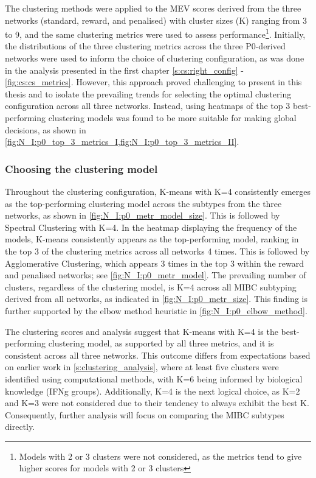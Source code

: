 The clustering methods were applied to the MEV scores derived from the three networks (standard, reward, and penalised) with cluster sizes (K) ranging from 3 to 9, and the same clustering metrics were used to assess performance\footnote{Models with 2 or 3 clusters were not considered, as the metrics tend to give higher scores for models with 2 or 3 clusters}. Initially, the distributions of the three clustering metrics across the three P0-derived networks were used to inform the choice of clustering configuration, as was done in the analysis presented in the first chapter \cref{s:cs:right_config} - \cref{fig:cs:cs_metrics}. However, this approach proved challenging to present in this thesis and to isolate the prevailing trends for selecting the optimal clustering configuration across all three networks. Instead, using heatmaps of the top 3 best-performing clustering models was found to be more suitable for making global decisions, as shown in \cref{fig:N_I:p0_top_3_metrics_I,fig:N_I:p0_top_3_metrics_II}.

\subsubsection*{Choosing the clustering model} \label{s:ap:p0_clustering}

Throughout the clustering configuration, K-means with K=4 consistently emerges as the top-performing clustering model across the subtypes from the three networks, as shown in \cref{fig:N_I:p0_metr_model_size}. This is followed by Spectral Clustering with K=4. In the heatmap displaying the frequency of the models, K-means consistently appears as the top-performing model, ranking in the top 3 of the clustering metrics across all networks 4 times. This is followed by Agglomerative Clustering, which appears 3 times in the top 3 within the reward and penalised networks; see \cref{fig:N_I:p0_metr_model}. The prevailing number of clusters, regardless of the clustering model, is K=4 across all MIBC subtyping derived from all networks, as indicated in \cref{fig:N_I:p0_metr_size}. This finding is further supported by the elbow method heuristic in \cref{fig:N_I:p0_elbow_method}.

The clustering scores and analysis suggest that K-means with K=4 is the best-performing clustering model, as supported by all three metrics, and it is consistent across all three networks. This outcome differs from expectations based on earlier work in \cref{s:clustering_analysis}, where at least five clusters were identified using computational methods, with K=6 being informed by biological knowledge (IFNg groups). Additionally, K=4 is the next logical choice, as K=2 and K=3 were not considered due to their tendency to always exhibit the best K. Consequently, further analysis will focus on comparing the MIBC subtypes directly.


